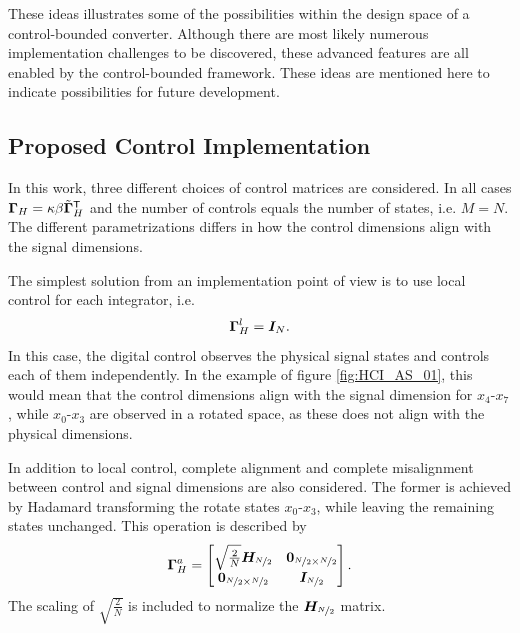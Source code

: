 These ideas illustrates some of the possibilities within the design space of a control-bounded converter. Although there are most likely numerous implementation challenges to be discovered, these advanced features are all enabled by the control-bounded framework. These ideas are mentioned here to indicate possibilities for future development.

\subsection{Proposed Control Implementation}
In this work, three different choices of control matrices are considered. In all cases $\bm{\Gamma}_{H} = \kappa \beta \tilde{\bm{\Gamma}}^\mathsf{T}_{H}$ and the number of controls equals the number of states, i.e. $M=N$. The different parametrizations differs in how the control dimensions align with the signal dimensions.

The simplest solution from an implementation point of view is to use local control for each integrator, i.e.
\begin{equation}
    \bm{\Gamma}_{H}^l = \bm{I}_{N}.
\end{equation}
In this case, the digital control observes the physical signal states and controls each of them independently. In the example of figure \ref{fig:HCI_AS_01}, this would mean that the control dimensions align with the signal dimension for $x_4$-$x_7$, while $x_0$-$x_3$ are observed in a rotated space, as these does not align with the physical dimensions.

In addition to local control, complete alignment and complete misalignment between control and signal dimensions are also considered. The former is achieved by Hadamard transforming the rotate states $x_0$-$x_3$, while leaving the remaining states unchanged. This operation is described by
\begin{equation}
    \bm{\Gamma}_{H}^a =
    \begin{bmatrix}
        \sqrt{\frac{2}{N}}\bm{H_}{\nicefrac{N}{2}}    & \bm{0}_{\nicefrac{N}{2} \times \nicefrac{N}{2}} \\
        \bm{0}_{\nicefrac{N}{2} \times \nicefrac{N}{2}}  & \bm{I}_{\nicefrac{N}{2}}
    \end{bmatrix}.
\end{equation}
The scaling of $\sqrt{\frac{2}{N}}$ is included to normalize the $\bm{H_}{\nicefrac{N}{2}}$ matrix.

